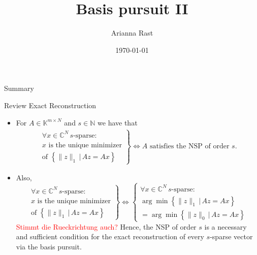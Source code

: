 \documentclass[11pt]{beamer}
\author[Autor]{Arianna Rast}
\title{Basis pursuit II}
\institute[]{LMU Munich}
\date{\today}
\newcommand{\CC}{\mathbb{C}}
\newcommand{\NN}{\mathbb{N}}
\newcommand{\KK}{\mathbb{K}}
\begin{document}
\begin{frame}
\titlepage
\end{frame}

\begin{frame}{Summary}
\tableofcontents 
\end{frame}

\begin{frame}{Review Exact Reconstruction}
\begin{itemize}
	\item For \(A\in \KK^{m\times N}\) and \(s\in \NN\) we have that
	\begin{align*}
	\left.\begin{array}{c}
		\forall x\in \CC^N\,s\text{-sparse}:\\
		x\text{ is the unique minimizer} \\  \text{of }
		\left\{\|z\|_1\,\big|\, Az=Ax\right\}
	\end{array}\right\}
\iff  A\text{ satisfies the NSP of order }s.
\end{align*}
\item Also, 
\[\left.\begin{array}{c}
		\forall x\in \CC^N\,s\text{-sparse}:\\
		x\text{ is the unique minimizer} \\  \text{of }
		\left\{\|z\|_1\,\big|\, Az=Ax\right\}
	\end{array}\right\} \iff \left\{\begin{array}{c}
		\forall x\in \CC^N\,s\text{-sparse}:\\
		\arg\min\left\{\|z\|_1\,\big|\,Az=Ax\right\}\\
		=\arg\min\left\{\|z\|_0\,\big|\,Az=Ax\right\}
	\end{array}\right.

\]
\textcolor{red}{Stimmt die Rueckrichtung auch?}
Hence, the NSP of order \(s\) is a necessary and sufficient condition for the exact reconstruction of every \(s\)-sparse vector via the basis pursuit.
\end{itemize}
\end{frame}
\end{document}
